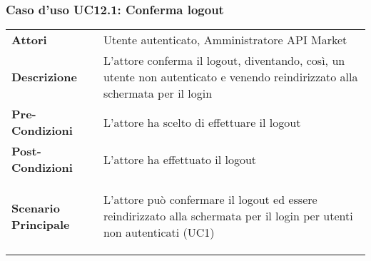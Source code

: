 \newpage
\subsubsection{Caso d'uso UC12.1: Conferma logout}
\label{UC12.1}

\renewcommand*{\arraystretch}{1.6}
\begin{longtable}{ l | p{11cm}}
	\hline
	\rowcolor{Gray}
	\multicolumn{2}{c}{UC12.1 - Conferma logout} \\
	\hline
	\textbf{Attori} &Utente autenticato, Amministratore API Market \\
	\textbf{Descrizione} &L'attore conferma il logout, diventando, così, un utente non autenticato e venendo reindirizzato alla schermata per il login\\
	\textbf{Pre-Condizioni} &L'attore ha scelto di effettuare il logout\\
	\textbf{Post-Condizioni}&L'attore ha effettuato il logout\\
	\textbf{Scenario Principale} & \begin{enumerate*}[label=(\arabic*.),itemjoin={\newline}]
		\item L'attore può confermare il logout ed essere reindirizzato alla schermata per il login per utenti non autenticati (UC1)
	\end{enumerate*}\\
\end{longtable}
